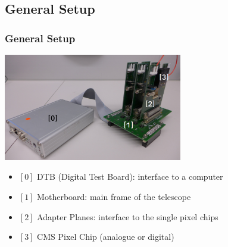 \documentclass[9pt]{beamer}
\begin{document}
\subsection{General Setup}
\begin{frame}
	\frametitle{General Setup}
	\begin{center}
		\includegraphics[width=7.8cm]{Pics/setup}
	\end{center}
	\begin{itemize}
		\item $[0]$ DTB (Digital Test Board): interface to a computer
		\item $[1]$ Motherboard: main frame of the telescope
		\item $[2]$ Adapter Planes: interface to the single pixel chips
		\item $[3]$ CMS Pixel Chip (analogue or digital)
	\end{itemize}
\end{frame}
\end{document}
